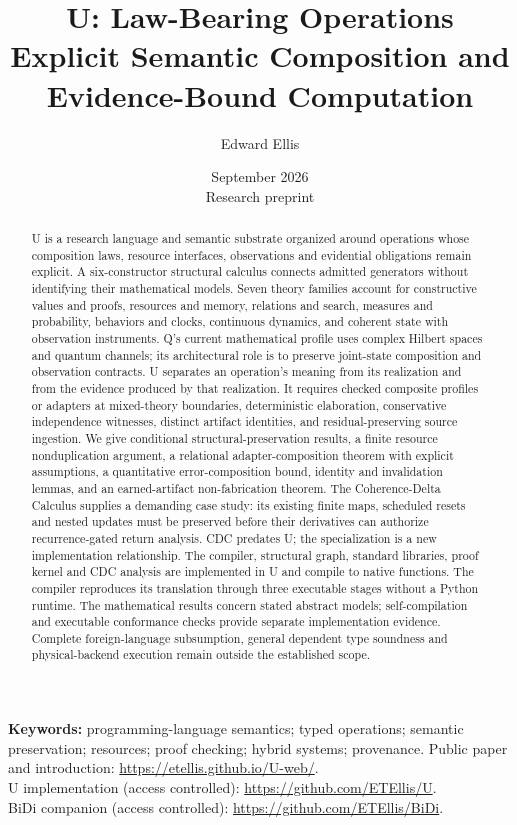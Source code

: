 \documentclass[11pt]{article}
\title{\vspace{-1em}\textbf{U: Law-Bearing Operations}\\[.4em]
  \large Explicit Semantic Composition and Evidence-Bound Computation}
\author{Edward Ellis}
\date{September 2026\\[.4em]\small Research preprint}
\theoremstyle{remark}
\begin{document}
\maketitle
\thispagestyle{empty}
\begin{abstract}
U is a research language and semantic substrate organized around operations
whose composition laws, resource interfaces, observations and evidential
obligations remain explicit. A six-constructor structural calculus connects
admitted generators without identifying their mathematical models. Seven
theory families account for constructive values and proofs, resources and
memory, relations and search, measures and probability, behaviors and clocks,
continuous dynamics, and coherent state with observation instruments. Q's
current mathematical profile uses complex Hilbert spaces and quantum channels;
its architectural role is to preserve joint-state composition and observation
contracts. U separates an operation's meaning from its realization and from
the evidence produced by that realization. It requires checked composite
profiles or adapters at
mixed-theory boundaries, deterministic elaboration, conservative independence
witnesses, distinct artifact identities, and residual-preserving source
ingestion. We give conditional structural-preservation results, a finite
resource nonduplication argument, a relational adapter-composition theorem
with explicit assumptions, a quantitative error-composition bound, identity
and invalidation lemmas, and an earned-artifact non-fabrication theorem. The
Coherence-Delta Calculus supplies a demanding case study: its existing finite
maps, scheduled resets and nested updates must be preserved before their
derivatives can authorize recurrence-gated return analysis. CDC predates U;
the specialization is a new implementation relationship. The compiler,
structural graph, standard libraries, proof kernel and CDC analysis are
implemented in U and compile to native functions. The compiler reproduces
its translation through three executable stages without a Python runtime.
The mathematical results concern stated abstract models; self-compilation
and executable conformance checks provide separate implementation evidence.
Complete foreign-language subsumption, general dependent type soundness and
physical-backend execution remain outside the established scope.
\end{abstract}
\vspace{.7em}
\noindent\textbf{Keywords:} programming-language semantics; typed operations;
semantic preservation; resources; proof checking; hybrid systems; provenance.
\vfill
\noindent\small Public paper and introduction:
\url{https://etellis.github.io/U-web/}.\\
U implementation (access controlled): \url{https://github.com/ETEllis/U}.\\
BiDi companion (access controlled): \url{https://github.com/ETEllis/BiDi}.
\newpage
{\footnotesize\setlength{\parskip}{0pt}\tableofcontents}
\newpage
\end{document}
